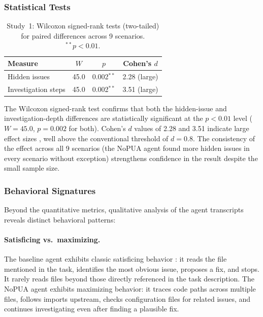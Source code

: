 \documentclass[11pt]{article}
\begin{document}
\subsubsection{Statistical Tests}

\begin{table}[t]
\centering
\small
\begin{tabular}{@{}lccc@{}}
\toprule
\textbf{Measure} & \textbf{$W$} & \textbf{$p$} & \textbf{Cohen's $d$} \\
\midrule
Hidden issues & 45.0 & 0.002$^{**}$ & 2.28 (large) \\
Investigation steps & 45.0 & 0.002$^{**}$ & 3.51 (large) \\
\bottomrule
\end{tabular}
\caption*{\small Study~1: Wilcoxon signed-rank tests (two-tailed) for paired differences across 9 scenarios. $^{**}p < 0.01$.}
\end{table}

The Wilcoxon signed-rank test \cite{wilcoxon1945individual} confirms that both the hidden-issue and investigation-depth differences are statistically significant at the $p < 0.01$ level ($W = 45.0$, $p = 0.002$ for both). Cohen's $d$ values of 2.28 and 3.51 indicate large effect sizes \cite{cohen1992power}, well above the conventional threshold of $d = 0.8$. The consistency of the effect across all 9 scenarios (the NoPUA agent found more hidden issues in every scenario without exception) strengthens confidence in the result despite the small sample size.

\subsubsection{Behavioral Signatures}

Beyond the quantitative metrics, qualitative analysis of the agent transcripts reveals distinct behavioral patterns:

\paragraph{Satisficing vs.\ maximizing.} The baseline agent exhibits classic satisficing behavior \cite{simon1956rational}: it reads the file mentioned in the task, identifies the most obvious issue, proposes a fix, and stops. It rarely reads files beyond those directly referenced in the task description. The NoPUA agent exhibits maximizing behavior: it traces code paths across multiple files, follows imports upstream, checks configuration files for related issues, and continues investigating even after finding a plausible fix.
\end{document}
